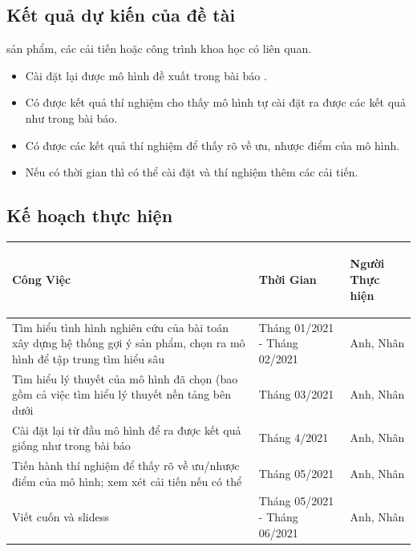 \documentclass{article}[14pt]
\begin{document}
{    
    \subsection{Kết quả dự kiến của đề tài}
        
sản phẩm, các cải tiến hoặc công trình khoa học có liên quan.
    \begin{itemize}
        \item Cài đặt lại được mô hình đề xuất trong bài báo \cite{mvae}.
        \item Có được kết quả thí nghiệm cho thấy mô hình tự cài đặt ra được 
các kết quả như trong bài báo.
        \item Có được các kết quả thí nghiệm để thấy rõ về ưu, nhược điểm 
của mô hình.
        \item Nếu có thời gian thì có thể cài đặt và thí nghiệm thêm các cải 
tiến.
    \end{itemize}
    
    \subsection{Kế hoạch thực hiện}

\begin{tabular}{ | m{20em} | m{4cm}| m{4cm} | } 

  \hline
   \centering\textbf { Công Việc} &  \centering\textbf{Thời Gian}  & 
\begin{center}
        \textbf{Người Thực hiện}   \end{center} \\ 
  \hline
  Tìm hiểu tình hình nghiên cứu của bài toán xây dựng hệ thống gợi ý sản 
phẩm, chọn ra mô hình để tập trung tìm hiểu sâu & Tháng 01/2021 - Tháng 
02/2021 & Anh, Nhân \\ 
  \hline
  Tìm hiểu lý thuyết của mô hình đã chọn (bao gồm cả việc tìm hiểu lý thuyết 
nền tảng bên dưới &  Tháng 03/2021 & Anh, Nhân \\ 
  \hline
  Cài đặt lại từ đầu mô hình để ra được kết quả giống như trong bài báo &  
Tháng 4/2021 & Anh, Nhân \\
  \hline
  Tiến hành thí nghiệm để thấy rõ về ưu/nhược điểm của mô hình; xem xét cải 
tiến nếu có thể &  Tháng 05/2021 & Anh, Nhân \\
  \hline
 Viết cuốn và slidess &  Tháng 05/2021 - Tháng 06/2021 & Anh, Nhân \\
 \hline
\end{tabular}


   
       
    
    }
    
    
    \nocite{*}
\end{document}
